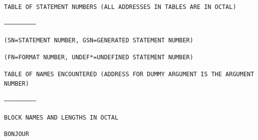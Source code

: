 

\texttt{TABLE OF STATEMENT NUMBERS (ALL ADDRESSES IN TABLES ARE IN OCTAL)}

\texttt{--------------------------}


\texttt{(SN=STATEMENT NUMBER, GSN=GENERATED STATEMENT NUMBER)}

\texttt{(FN=FORMAT NUMBER, UNDEF*=UNDEFINED STATEMENT NUMBER)}

\texttt{TABLE OF NAMES ENCOUNTERED (ADDRESS FOR DUMMY ARGUMENT IS THE ARGUMENT NUMBER)}

\texttt{--------------------------}


\texttt{BLOCK NAMES AND LENGTHS IN OCTAL}


\texttt{BONJOUR}


